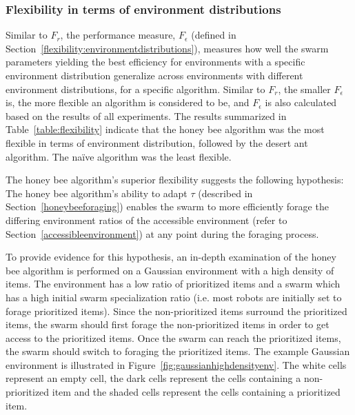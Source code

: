 \documentclass[preprint,12pt]{elsarticle}
\begin{document}
\subsubsection{Flexibility in terms of environment distributions}
\label{setup:flexibility:environmentdistributions}

Similar to $F_r$, the performance measure, $F_\epsilon$ (defined in Section~\ref{flexibility:environmentdistributions}), measures how well the swarm parameters yielding the best efficiency for environments with a specific environment distribution generalize across environments with different environment distributions, for a specific algorithm. Similar to $F_r$, the smaller $F_\epsilon$ is, the more flexible an algorithm is considered to be, and $F_\epsilon$ is also calculated based on the results of all experiments. The results summarized in Table~\ref{table:flexibility} indicate that the honey bee algorithm was the most flexible in terms of environment distribution, followed by the desert ant algorithm. The na\"ive algorithm was the least flexible.

The honey bee algorithm's superior flexibility suggests the following hypothesis: The honey bee algorithm's ability to adapt $\tau$ (described in Section~\ref{honeybeeforaging}) enables the swarm to more efficiently forage the differing environment ratios of the accessible environment (refer to Section~\ref{accessibleenvironment}) at any point during the foraging process.

To provide evidence for this hypothesis, an in-depth examination of the honey bee algorithm is performed on a Gaussian environment with a high density of items. The environment has a low ratio of prioritized items and a swarm which has a high initial swarm specialization ratio (i.e. most robots are initially set to forage prioritized items). Since the non-prioritized items surround the prioritized items, the swarm should first forage the non-prioritized items in order to get access to the prioritized items. Once the swarm can reach the prioritized items, the swarm should switch to foraging the prioritized items. The example Gaussian environment is illustrated in Figure~\ref{fig:gaussianhighdensityenv}. The white cells represent an empty cell, the dark cells represent the cells containing a non-prioritized item and the shaded cells represent the cells containing a prioritized item. 
\end{document}

